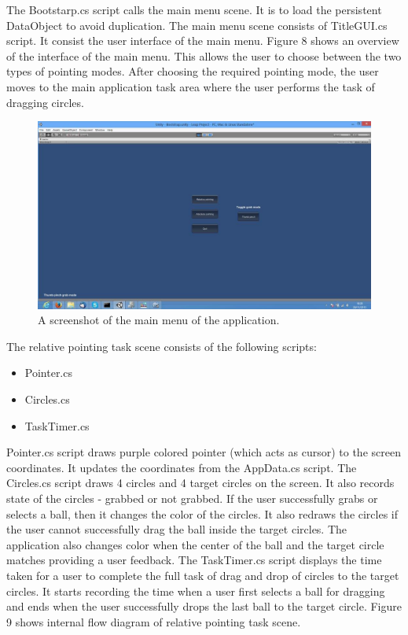 \documentclass[titlepage]{article}
\begin{document}
The Bootstarp.cs script calls the main menu scene. It is to load the persistent DataObject to avoid duplication. The main menu scene consists of TitleGUI.cs script. It consist the user interface of the main menu. Figure 8 shows an overview of the interface of the main menu. This allows the user to choose between the two types of pointing modes. After choosing the required pointing mode, the user moves to the main application task area where the user performs the task of dragging circles.

\begin{figure}[!h]
\centering
\includegraphics[width=7.0in]{Figure_8}
\caption{A screenshot of the main menu of the application.}
\end{figure}

The relative pointing task scene consists of the following scripts:

\begin{itemize}
    \item Pointer.cs
    \item Circles.cs
    \item TaskTimer.cs
\end{itemize}

Pointer.cs script draws purple colored pointer (which acts as cursor) to the screen coordinates. It updates the coordinates from the AppData.cs script. The Circles.cs script draws 4 circles and 4 target circles on the screen. It also records state of the circles - grabbed or not grabbed. If the user successfully grabs or selects a ball, then it changes the color of the circles. It also redraws the circles if the user cannot successfully drag the ball inside the target circles. The application also changes color when the center of the ball and the target circle matches providing a user feedback. The TaskTimer.cs script displays the time taken for a user to complete the full task of drag and drop of circles to the target circles. It starts recording the time when a user first selects a ball for dragging and ends when the user successfully drops the last ball to the target circle. Figure 9 shows internal flow diagram of relative pointing task scene. 
\end{document}
